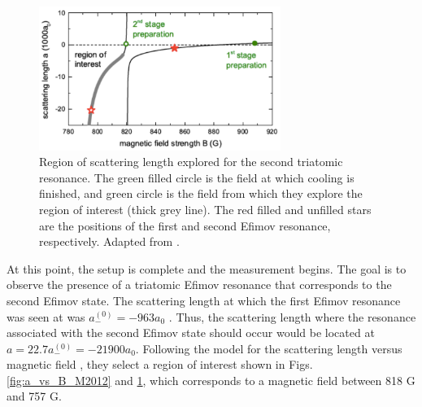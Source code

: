 \documentclass[prl,onecolumn,amsmath,amssymb,titlepage,nofootinbib,preprint]{revtex4-1}
\begin{document}
	 \begin{figure}
	 	\includegraphics[width=0.7\textwidth]{Figures/experimental_steps}
	 	\caption{Region of scattering length explored for the second triatomic resonance.  The green filled circle is the field at which cooling is finished, and green circle is the field from which they explore the region of interest (thick grey line). The red filled and unfilled stars are the positions of the first and second Efimov resonance, respectively. Adapted from \cite{Huang2014}.}
	 	\label{fig:experimental steps}
	 \end{figure}
	 
	 At this point, the setup is complete and the measurement begins.  The goal is to observe the presence of a triatomic Efimov resonance that corresponds to the second Efimov state.  The scattering length at which the first Efimov resonance was seen at was $a^{(0)}_{-}=-963a_{0}$ \cite{Berninger2011}.  Thus, the scattering length where the resonance associated with the second Efimov state should occur would be located at $a=22.7a^{(0)}_{-}=-21900a_{0}$.  Following the model for the scattering length versus magnetic field \cite{Berninger2013}, they select a region of interest shown in Figs. \ref{fig:a_vs_B_M2012} and \ref{fig:experimental steps}, which corresponds to a magnetic field between 818 G and 757 G.
	 

	 	
\end{document}
